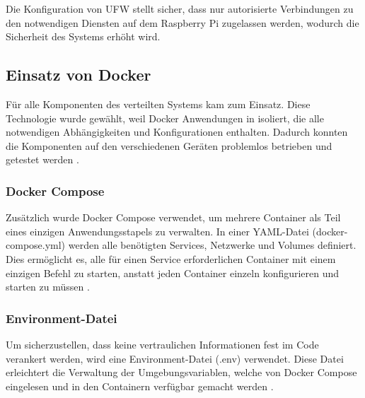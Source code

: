 Die Konfiguration von UFW stellt sicher, dass nur autorisierte Verbindungen zu den notwendigen Diensten auf dem Raspberry Pi zugelassen werden, wodurch die Sicherheit des Systems erhöht wird.


\subsection{Einsatz von Docker}

Für alle Komponenten des verteilten Systems kam  zum Einsatz. Diese Technologie wurde gewählt, weil Docker Anwendungen in   isoliert, die alle notwendigen Abhängigkeiten und Konfigurationen enthalten. Dadurch konnten die Komponenten auf  den verschiedenen Geräten problemlos betrieben und getestet werden \cite{Aerisdocker}.

\subsubsection{Docker Compose}

Zusätzlich wurde Docker Compose verwendet, um mehrere Container als Teil eines einzigen Anwendungsstapels zu verwalten. In einer YAML-Datei (docker-compose.yml) werden alle benötigten Services, Netzwerke und Volumes definiert. Dies ermöglicht es, alle für einen Service erforderlichen Container mit einem einzigen Befehl zu starten, anstatt jeden Container einzeln konfigurieren und starten zu müssen \cite{DockerCompose}.

\subsubsection{Environment-Datei}

Um sicherzustellen, dass keine vertraulichen Informationen fest im Code verankert werden, wird eine Environment-Datei (.env) verwendet. Diese Datei erleichtert die Verwaltung der Umgebungsvariablen, welche von Docker Compose eingelesen und in den Containern verfügbar gemacht werden \cite{DockerEnv}.
